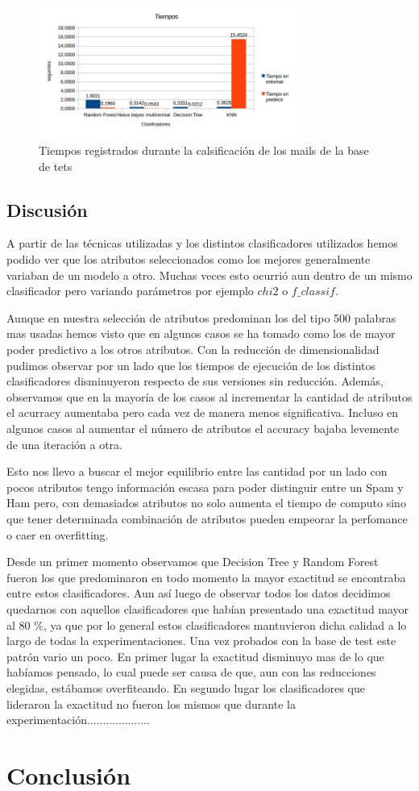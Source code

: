 \documentclass[a4paper]{article}
\begin{document}
\begin{figure}[h]
   \centering
    \includegraphics[width=0.75\textwidth]{imagenes/tiempos.jpg}
    \caption{Tiempos registrados durante la calsificación de los mails de la base de tets} 
  \label{fig:2}
\end{figure}


\pagebreak
\subsection{Discusión}


  
A partir de las técnicas utilizadas y los distintos clasificadores utilizados hemos podido ver que los atributos seleccionados como los mejores generalmente variaban de un modelo a otro. Muchas veces esto ocurrió aun dentro de un mismo clasificador pero variando parámetros por ejemplo  $chi2$ o $f\_classif$. 

Aunque en nuestra selección de atributos predominan los del tipo 500 palabras mas usadas hemos visto que en algunos casos se ha tomado como los de mayor poder predictivo a los otros atributos. Con la reducción de dimensionalidad pudimos observar por un lado que los tiempos de ejecución de los distintos clasificadores disminuyeron respecto de sus versiones sin reducción. Además, observamos que en la mayoría de los casos al incrementar la cantidad de atributos el acurracy aumentaba pero cada vez de manera menos significativa. Incluso en algunos casos al aumentar el número de atributos el accuracy bajaba levemente de una iteración a otra.

 Esto nos llevo a buscar el mejor equilibrio entre las cantidad por un lado con pocos atributos tengo información escasa para poder distinguir entre un Spam y Ham pero, con demasiados atributos no solo aumenta el tiempo de computo sino que tener determinada combinación de atributos pueden empeorar la perfomance o caer en overfitting. 
 
Desde un primer momento observamos que Decision Tree y Random Forest fueron los que predominaron en todo momento la mayor exactitud se encontraba entre estos clasificadores. Aun así luego de observar todos los datos decidimos quedarnos con aquellos clasificadores que habían presentado una exactitud mayor al 80 \%, ya que por lo general estos clasificadores mantuvieron dicha calidad a lo largo de todas la experimentaciones. Una vez probados con la base de test este patrón vario un poco. En primer lugar la exactitud disminuyo mas de lo que habíamos pensado, lo cual puede ser causa de que, aun con las reducciones elegidas, estábamos  overfiteando. 
En segundo lugar los clasificadores que lideraron la exactitud no fueron los mismos que durante la experimentación....................

\section{Conclusión}
\end{document}
